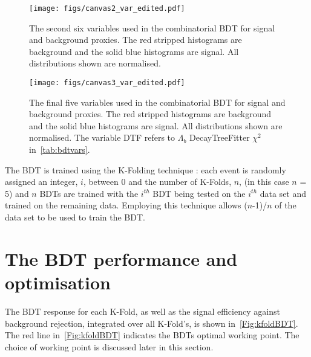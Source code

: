     \begin{figure}[!ht]\def\nh{0.6\textwidth}
  \centering
  \hspace*{-2cm}
  \texttt{[image: figs/canvas2\_var\_edited.pdf]}

  \caption{The second six variables used in the combinatorial BDT for signal and background proxies. The red stripped histograms are background and the solid blue histograms are signal. All distributions shown are normalised.}
  \label{Fig:bdtvar2}
    \end{figure}
    \FloatBarrier
    \begin{figure}[!ht]\def\nh{0.65\textwidth}
  \centering
  \hspace*{-1cm}
  \texttt{[image: figs/canvas3\_var\_edited.pdf]}

  \caption{The final five variables used in the combinatorial BDT for signal and background proxies. The red stripped histograms are background and the solid blue histograms are signal.  All distributions shown are normalised. The variable \Lb DTF \chisq refers to $\Lambda_{b}$ DecayTreeFitter $\chi^{2}$ in~\autoref{tab:bdtvars}. }
  
  \label{Fig:bdtvar3}
    \end{figure}
    \FloatBarrier
   
    The BDT is trained using the K-Folding technique \cite{kfold}: each event is randomly assigned an integer, $i$, between 0 and the number of K-Folds, $n$, (in this case $n$ = 5) and $n$ BDTs are trained with the $i^{th}$ BDT being tested on the $i^{th}$ data set and trained on the remaining data. Employing this technique allows ($n$-1)/$n$ of the data set to be used to train the BDT. 





\section{The BDT performance and optimisation}
\label{sec:opt}
The BDT response for each K-Fold, as well as the signal efficiency against background rejection, integrated over all K-Fold's, is shown in~\autoref{Fig:kfoldBDT}. The red line in~\autoref{Fig:kfoldBDT}\protect{} indicates the BDTs optimal working point. The choice of working point is discussed later in this section.


